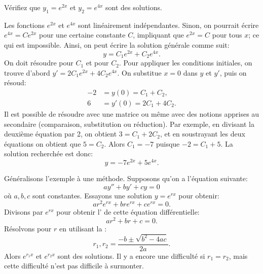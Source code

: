 \begin{exercise}
Vérifiez que $y_1= e^{2x}$ et $y_2= e^{4x}$ sont des solutions.
\end{exercise}

Les fonctions  $e^{2x}$ et $e^{4x}$ sont linéairement indépendantes. Sinon, on pourrait  écrire  $e^{4x} = C e^{2x}$ pour une certaine constante $C$,
impliquant que $e^{2x} = C$ pour tous $x$; ce qui est impossible. 
Ainsi, on peut écrire la solution générale comme suit:
\begin{equation*}
y = C_1 e^{2x} + C_2 e^{4x} .
\end{equation*}
On doit résoudre pour $C_1$ et pour $C_2$.  Pour appliquer les conditions initiales,
on trouve d'abord $y' = 2 C_1 e^{2x} + 4 C_2 e^{4x}$.  On substitue $x=0$ dans
$y$ et $y'$, puis on résoud: 
\begin{align*}
-2 & = y(0) = C_1 + C_2 , \\
6 & = y'(0) = 2 C_1 + 4 C_2 .
\end{align*}
Il est possible de résoudre avec une matrice ou même avec des notions apprises au secondaire (comparaison, substitution ou réduction). Par exemple, en divisant la deuxième équation par 2, on obtient $3 = C_1 + 2 C_2$, et en soustrayant les deux équations on obtient que $5 = C_2$.  Alors $C_1 = -7$ puisque $-2 = C_1 + 5$.  La solution recherchée est donc:
\begin{equation*}
y = -7 e^{2x} + 5 e^{4x} .
\end{equation*}

\medskip

Généralisons l'exemple à une méthode. Supposons qu'on a l'équation suivante:
\begin{equation} \label{ccsol:eq}
a y'' + b y' + c y = 0 
\end{equation}
où $a, b, c$ sont constantes.  Essayons une solution  $y = e^{rx}$ pour obtenir:   
\begin{equation*}
a r^2 e^{rx} + 
b r e^{rx} + 
c e^{rx} = 0 .
\end{equation*}
Divisons par  $e^{rx}$ pour obtenir  
l'\emph{} de cette équation différentielle:
\begin{equation*}
a r^2 + 
b r + 
c = 0 .
\end{equation*}
Résolvons pour $r$ en utilisant la  : 
\begin{equation*}
r_1, r_2 = \frac{-b \pm \sqrt{b^2 - 4ac}}{2a} .
\end{equation*}
Alors $e^{r_1 x}$ et $e^{r_2 x}$ sont des solutions.  Il y a encore une difficulté si $r_1 = r_2$, mais cette difficulté n'est pas difficile à surmonter.  

